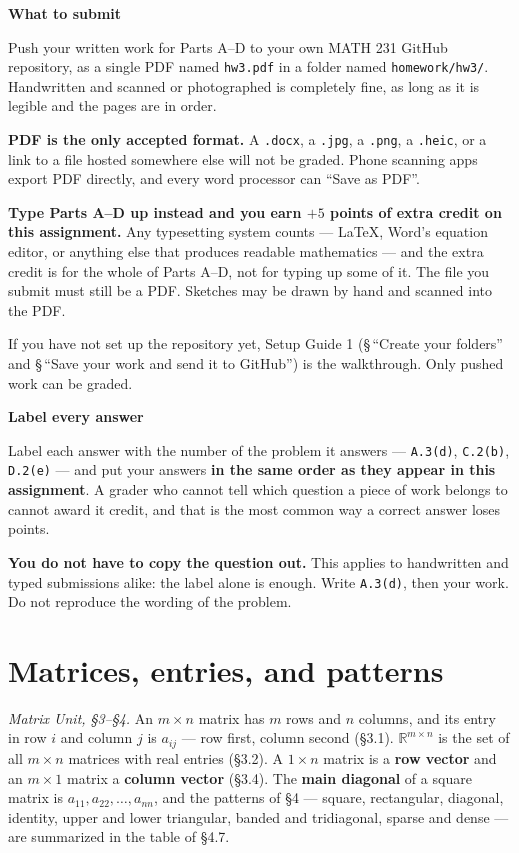 \documentclass[11pt]{article}
\newcounter{prob}[section]
\newenvironment{callout}[1]
  {\par\medskip\needspace{5\baselineskip}%
   \begin{lrbox}{\qcbox}%
   \begin{minipage}{\dimexpr\textwidth-2\fboxsep-4pt}%
   \setlength{\parskip}{0.4em}%
   \textbf{\sffamily\color{RoyalBlue}#1}\par}
  {\end{minipage}\end{lrbox}%
   \begin{center}\colorbox{softbg}{\usebox{\qcbox}}\end{center}\medskip}
\newcommand{\R}{\mathbb{R}}
\begin{document}
\begin{callout}{What to submit}
Push your written work for Parts A--D to your own MATH 231 GitHub repository,
as a single PDF named \texttt{hw3.pdf} in a folder named \texttt{homework/hw3/}.
Handwritten and scanned or photographed is completely fine, as long as it is
legible and the pages are in order.

\textbf{PDF is the only accepted format.} A \texttt{.docx}, a \texttt{.jpg}, a
\texttt{.png}, a \texttt{.heic}, or a link to a file hosted somewhere else will
not be graded. Phone scanning apps export PDF directly, and every word processor
can ``Save as PDF''.

\textbf{Type Parts A--D up instead and you earn $+5$ points of extra credit on
this assignment.} Any typesetting system counts --- \LaTeX, Word's equation
editor, or anything else that produces readable mathematics --- and the extra
credit is for the whole of Parts A--D, not for typing up some of it. The file
you submit must still be a PDF. Sketches may be drawn by hand and scanned into
the PDF.

If you have not set up the repository yet, Setup Guide 1 (\S\,``Create your
folders'' and \S\,``Save your work and send it to GitHub'') is the walkthrough.
Only pushed work can be graded.
\end{callout}

\begin{callout}{Label every answer}
Label each answer with the number of the problem it answers --- \texttt{A.3(d)},
\texttt{C.2(b)}, \texttt{D.2(e)} --- and put your answers \textbf{in the same
order as they appear in this assignment}. A grader who cannot tell which
question a piece of work belongs to cannot award it credit, and that is the most
common way a correct answer loses points.

\textbf{You do not have to copy the question out.} This applies to handwritten
and typed submissions alike: the label alone is enough. Write \texttt{A.3(d)},
then your work. Do not reproduce the wording of the problem.
\end{callout}

\section{Matrices, entries, and patterns}
\emph{Matrix Unit, \S3--\S4.} An $m\times n$ matrix has $m$ rows and $n$
columns, and its entry in row $i$ and column $j$ is $a_{ij}$ --- row first,
column second (\S3.1). $\R^{m\times n}$ is the set of all $m\times n$ matrices
with real entries (\S3.2). A $1\times n$ matrix is a \textbf{row vector} and an
$m\times1$ matrix a \textbf{column vector} (\S3.4). The \textbf{main diagonal}
of a square matrix is $a_{11},a_{22},\dots,a_{nn}$, and the patterns of \S4 ---
square, rectangular, diagonal, identity, upper and lower triangular, banded and
tridiagonal, sparse and dense --- are summarized in the table of \S4.7.
\end{document}
